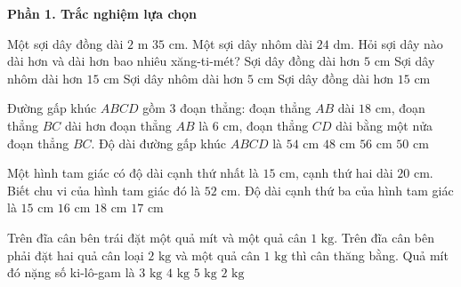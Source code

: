 \textbf{Phần 1. Trắc nghiệm lựa chọn}

\begin{ex} %
Một sợi dây đồng dài $2\text{ m } 35\text{ cm}$. Một sợi dây nhôm dài $24\text{ dm}$. Hỏi sợi dây nào dài hơn và dài hơn bao nhiêu xăng-ti-mét?
\choice
{Sợi dây đồng dài hơn $5\text{ cm}$}
{Sợi dây nhôm dài hơn $15\text{ cm}$}
{\True Sợi dây nhôm dài hơn $5\text{ cm}$}
{Sợi dây đồng dài hơn $15\text{ cm}$}
\end{ex}

\begin{ex} %
Đường gấp khúc $ABCD$ gồm 3 đoạn thẳng: đoạn thẳng $AB$ dài $18\text{ cm}$, đoạn thẳng $BC$ dài hơn đoạn thẳng $AB$ là $6\text{ cm}$, đoạn thẳng $CD$ dài bằng một nửa đoạn thẳng $BC$. Độ dài đường gấp khúc $ABCD$ là
\choice
{\True $54\text{ cm}$}
{$48\text{ cm}$}
{$56\text{ cm}$}
{$50\text{ cm}$}
\end{ex}

\begin{ex} %
Một hình tam giác có độ dài cạnh thứ nhất là $15\text{ cm}$, cạnh thứ hai dài $20\text{ cm}$. Biết chu vi của hình tam giác đó là $52\text{ cm}$. Độ dài cạnh thứ ba của hình tam giác là
\choice
{$15\text{ cm}$}
{$16\text{ cm}$}
{$18\text{ cm}$}
{\True $17\text{ cm}$}
\end{ex}

\begin{ex} %
Trên đĩa cân bên trái đặt một quả mít và một quả cân $1\text{ kg}$. Trên đĩa cân bên phải đặt hai quả cân loại $2\text{ kg}$ và một quả cân $1\text{ kg}$ thì cân thăng bằng. Quả mít đó nặng số ki-lô-gam là
\choice
{$3\text{ kg}$}
{\True $4\text{ kg}$}
{$5\text{ kg}$}
{$2\text{ kg}$}
\end{ex}

